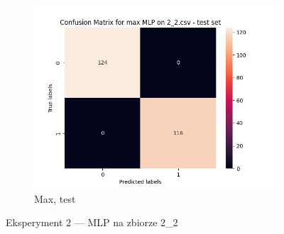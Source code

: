 \documentclass[12pt]{article}
\newcommand*{\subfigwidth}{0.24\textwidth}
\begin{document}
\begin{figure}[H]
\begin{subfigure}[t]{\subfigwidth}
        \includegraphics[width=\linewidth]{img/exp_2/mlp/2_2/max/test_matrix.png}
        \caption{Max, test}
    \end{subfigure} 
    
    \caption{Eksperyment 2 --- MLP na zbiorze 2\_2}
\end{figure}
\end{document}
